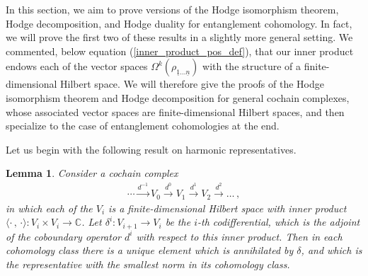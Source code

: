 \documentclass[12pt]{article}
\newtheorem{lemma}{Lemma}[section]
\newcommand{\ul}[1]{{\underline{#1}}}
\numberwithin{equation}{section}
\newcommand{\rhooneton}{{\rho_{\ul{1} \ldots \ul{n}}}}
\begin{document}
In this section, we aim to prove versions of the Hodge isomorphism theorem, Hodge decomposition, and Hodge duality for entanglement cohomology. In fact, we will prove the first two of these results in a slightly more general setting. We commented, below equation (\ref{inner_product_pos_def}), that our inner product endows each of the vector spaces $\Omega^k ( \rhooneton )$ with the structure of a finite-dimensional Hilbert space. We will therefore give the proofs of the Hodge isomorphism theorem and Hodge decomposition for general cochain complexes, whose associated vector spaces are finite-dimensional Hilbert spaces, and then specialize to the case of entanglement cohomologies at the end.

Let us begin with the following result on harmonic representatives.

\begin{lemma}\label{lemma_harmonic_rep}
Consider a cochain complex
\begin{align}
    \cdots \xrightarrow{d^{-1}} V_0 \xrightarrow{d^{0}} V_1 \xrightarrow{d^{1}} V_2 \xrightarrow{d^{2}} \ldots \, ,
\end{align}
%
in which each of the $V_i$ is a finite-dimensional Hilbert space with inner product $\langle \cdot \, , \, \cdot \rangle : V_i \times V_i \to \mathbb{C}$. Let $\delta^i : V_{i + 1} \to V_{i}$ be the $i$-th codifferential, which is the adjoint of the coboundary operator $d^i$ with respect to this inner product. Then in each cohomology class there is a unique element which is annihilated by $\delta$, and which is the representative with the smallest norm in its cohomology class. 

\end{lemma}
\end{document}

